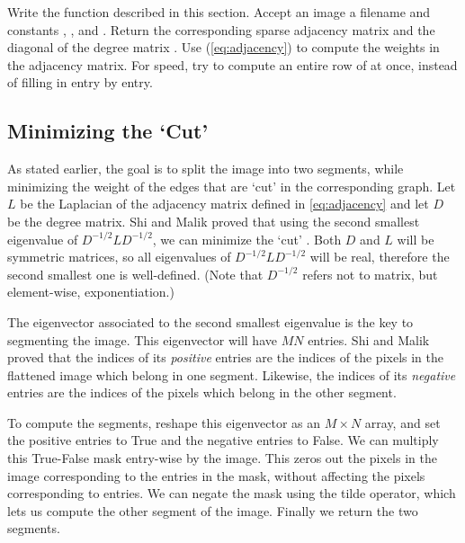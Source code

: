 \begin{problem}
Write the function  described in this section.
Accept an image a filename and constants , , and .
Return the corresponding sparse adjacency matrix  and the diagonal of the degree matrix .
Use (\ref{eq:adjacency}) to compute the weights in the adjacency matrix.
For speed, try to compute an entire row of  at once, instead of filling in  entry by entry.


\label{prob:adjacency_dream}
\end{problem}

\subsection*{Minimizing the `Cut'}
As stated earlier, the goal is to split the image into two segments, while minimizing the weight of the edges that are `cut' in the corresponding graph.
Let $L$ be the Laplacian of the adjacency matrix defined in \ref{eq:adjacency} and let $D$ be the degree matrix.
Shi and Malik proved that using the second smallest eigenvalue of $D^{-1/2}LD^{-1/2}$, we can minimize the `cut' .
Both $D$ and $L$ will be symmetric matrices, so all eigenvalues of $D^{-1/2}LD^{-1/2}$ will be real, therefore the second smallest one is well-defined.
(Note that $D^{-1/2}$ refers not to matrix, but element-wise, exponentiation.)

The eigenvector associated to the second smallest eigenvalue is the key to segmenting the image.
This eigenvector will have $MN$ entries.
Shi and Malik proved that the indices of its \emph{positive} entries are the indices of the pixels in the flattened image which belong in one segment.
Likewise, the indices of its \emph{negative} entries are the indices of the pixels which belong in the other segment.

To compute the segments, reshape this eigenvector as an $M \times N$ array, and set the positive entries to True and the negative entries to False.
We can multiply this True-False mask entry-wise by the image.
This zeros out the pixels in the image corresponding to the  entries in the mask, without affecting the pixels corresponding to  entries.
We can negate the mask using the tilde operator, which lets us compute the other segment of the image.
Finally we return the two segments.

